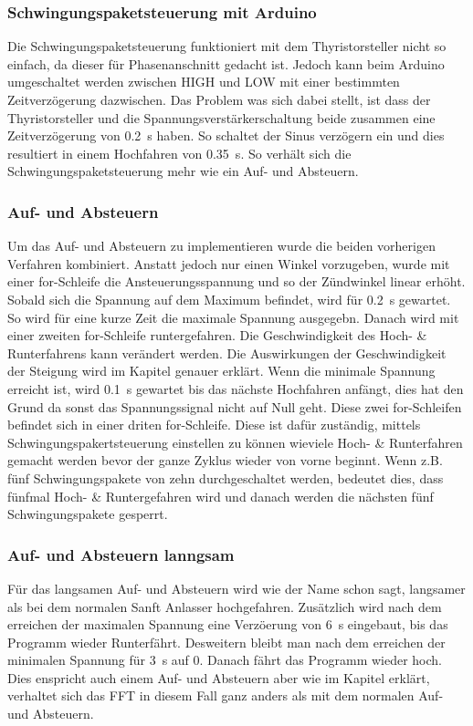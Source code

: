 \subsubsection{Schwingungspaketsteuerung mit Arduino}
Die Schwingungspaketsteuerung funktioniert mit dem Thyristorsteller nicht so einfach, da dieser für Phasenanschnitt gedacht ist. Jedoch kann beim Arduino umgeschaltet werden zwischen HIGH und LOW mit einer bestimmten Zeitverzögerung dazwischen. Das Problem was sich dabei stellt, ist dass der Thyristorsteller und die Spannungsverstärkerschaltung beide zusammen eine Zeitverzögerung von \SI{0.2}{s} haben. So schaltet der Sinus verzögern ein und dies resultiert in einem Hochfahren von \SI{0.35}{s}. So verhält sich die Schwingungspaketsteuerung mehr wie ein Auf- und Absteuern.

\subsubsection{Auf- und Absteuern}
Um das Auf- und Absteuern zu implementieren wurde die beiden vorherigen Verfahren kombiniert. Anstatt jedoch nur einen Winkel vorzugeben, wurde mit einer for-Schleife die Ansteuerungsspannung und so der Zündwinkel linear erhöht. Sobald sich die Spannung auf dem Maximum befindet, wird für \SI{0.2}{s} gewartet. So wird für eine kurze Zeit die maximale Spannung ausgegebn. Danach wird mit einer zweiten for-Schleife runtergefahren. Die Geschwindigkeit des Hoch- \& Runterfahrens kann verändert werden. Die Auswirkungen der Geschwindigkeit der Steigung wird im Kapitel  genauer erklärt. Wenn die minimale Spannung erreicht ist, wird \SI{0.1}{s} gewartet bis das nächste Hochfahren anfängt, dies hat den Grund da sonst das Spannungssignal nicht auf Null geht. Diese zwei for-Schleifen befindet sich in einer driten for-Schleife. Diese ist dafür zuständig, mittels Schwingungspakertsteuerung einstellen zu können wieviele Hoch- \& Runterfahren gemacht werden bevor der ganze Zyklus wieder von vorne beginnt. Wenn z.B. fünf Schwingungspakete von zehn durchgeschaltet werden, bedeutet dies, dass fünfmal Hoch- \& Runtergefahren wird und danach werden die nächsten fünf Schwingungspakete gesperrt.

\subsubsection{Auf- und Absteuern lanngsam}
Für das langsamen Auf- und Absteuern wird wie der Name schon sagt, langsamer als bei dem normalen Sanft Anlasser hochgefahren. Zusätzlich wird nach dem erreichen der maximalen Spannung eine Verzöerung von \SI{6}{s} eingebaut, bis das Programm wieder Runterfährt. Desweitern bleibt man nach dem erreichen der minimalen Spannung für \SI{3}{s} auf 0. Danach fährt das Programm wieder hoch. Dies enspricht auch einem Auf- und Absteuern aber wie im Kapitel  erklärt, verhaltet sich das FFT in diesem Fall ganz anders als mit dem normalen Auf- und Absteuern.

